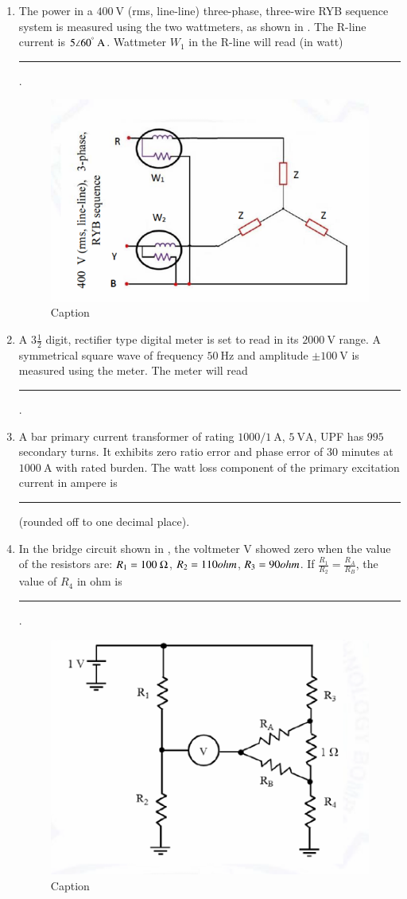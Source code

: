 \documentclass[journal,12pt,onecolumn]{IEEEtran}
\theoremstyle{remark}
\begin{document}
\begin{enumerate}
\item The power in a $400\ \text{V}$ (rms, line-line) three-phase, three-wire RYB sequence system is measured using the two wattmeters, as shown in . The R-line current is $5\angle 60^\degree\ \text{A}$. Wattmeter $W_1$ in the R-line will read (in watt) \rule{1.5cm}{0.4pt}. \par \hfill{}
\begin{figure}[H]
    \centering
    \includegraphics[width=0.5\linewidth]{Figs/Q-49.png}
    \caption{Caption}
    \label{49}
\end{figure}

\item A $3\frac{1}{2}$ digit, rectifier type digital meter is set to read in its $2000\ \text{V}$ range. A symmetrical square wave of frequency $50\ \text{Hz}$ and amplitude $\pm 100\ \text{V}$ is measured using the meter. The meter will read \rule{1.5cm}{0.4pt}. \par \hfill{}

\item A bar primary current transformer of rating $1000/1\ \text{A}$, $5\ \text{VA}$, UPF has $995$ secondary turns. It exhibits zero ratio error and phase error of $30$ minutes at $1000\ \text{A}$ with rated burden. The watt loss component of the primary excitation current in ampere is \rule{1.5cm}{0.4pt} (rounded off to one decimal place). \par \hfill{}

\item In the bridge circuit shown in , the voltmeter V showed zero when the value of the resistors are: $R_1 = 100\ \ohm$, $R_2 = 110\ \\ohm$, $R_3 = 90\ \\ohm$. If $\frac{R_1}{R_2} = \frac{R_A}{R_B}$,
the value of $R_4$ in ohm is \rule{1.5cm}{0.4pt}. \par \hfill{}
\begin{figure}[H]
    \centering
    \includegraphics[width=0.5\linewidth]{Figs/Q-52.png}
    \caption{Caption}
    \label{52}
\end{figure}


\end{enumerate}
\end{document}
